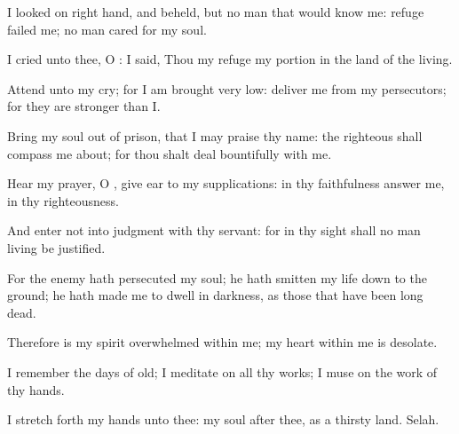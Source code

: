 {\Q {}I
looked on
{} right
hand, and
beheld, but
{} no man that would
know me:
refuge
failed me; no man
cared for my
soul.


\par }{\Q {}I
cried unto thee, O
{}: I
said, Thou
{} my
refuge
{} my
portion in the
land of the
living.


\par }{\Q {}Attend unto my
cry; for I am
brought
very
low:
deliver me from my
persecutors; for they are
stronger than I.


\par }{\Q {}Bring my
soul out of
prison, that I may
praise thy
name: the
righteous shall compass me
about; for thou shalt deal
bountifully with me.




\par }
{\Q {}Hear my
prayer, O
{}, give
ear to my
supplications: in thy
faithfulness
answer me,
{} in thy
righteousness.


\par }{\Q {}And
enter not into
judgment with thy
servant: for in thy
sight shall no man
living be
justified.


\par }{\Q {}For the
enemy hath
persecuted my
soul; he hath
smitten my
life
down to the
ground; he hath made me to
dwell in
darkness, as those that have been
long
dead.


\par }{\Q {}Therefore is my
spirit
overwhelmed within me; my
heart
within me is
desolate.


\par }{\Q {}I
remember the
days of
old; I
meditate on all thy
works; I
muse on the
work of thy
hands.


\par }{\Q {}I stretch
forth my
hands unto thee: my
soul
{} after thee, as a
thirsty
land.
Selah.


\par }{\BB \par }
